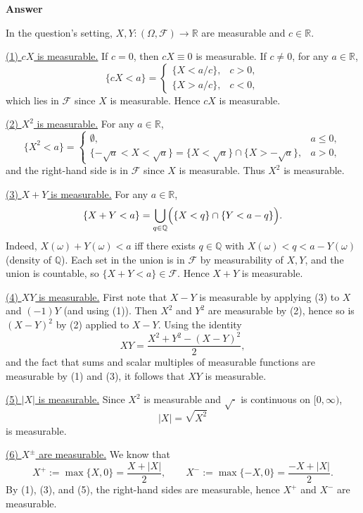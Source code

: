 \documentclass[letterpaper]{article}
\begin{document}
		\textbf{Answer}
		
			In the question's setting, $X,Y:(\Omega,\mathcal{F})\to\mathbb{R}$ are measurable and $c\in\mathbb{R}$.
			
			\medskip
			\noindent\underline{(1) $cX$ is measurable.}
			If $c=0$, then $cX\equiv 0$ is measurable. If $c\neq 0$, for any $a\in\mathbb{R}$,
			\[
			\{cX<a\}=
			\begin{cases}
				\{X<a/c\}, & c>0,\\
				\{X>a/c\}, & c<0,
			\end{cases}
			\]
			which lies in $\mathcal{F}$ since $X$ is measurable. Hence $cX$ is measurable.
			
			\medskip
			\noindent\underline{(2) $X^2$ is measurable.}
			For any $a\in\mathbb{R}$,
			\[
			\{X^2<a\}=
			\begin{cases}
				\emptyset, & a\le 0,\\
				\{-\sqrt{a}<X<\sqrt{a}\}
				=\{X<\sqrt{a}\}\cap\{X>-\sqrt{a}\}, & a>0,
			\end{cases}
			\]
			and the right-hand side is in $\mathcal{F}$ since $X$ is measurable. Thus $X^2$ is measurable.
			
			\medskip
			\noindent\underline{(3) $X+Y$ is measurable.}
			For any $a\in\mathbb{R}$,
			\[
			\{X+Y<a\}=\bigcup_{q\in\mathbb{Q}}\Bigl(\{X<q\}\cap\{Y<a-q\}\Bigr).
			\]
			Indeed, $X(\omega)+Y(\omega)<a$ iff there exists $q\in\mathbb{Q}$ with
			$X(\omega)<q<a-Y(\omega)$ (density of $\mathbb{Q}$).
			Each set in the union is in $\mathcal{F}$ by measurability of $X,Y$, and the union is countable,
			so $\{X+Y<a\}\in\mathcal{F}$. Hence $X+Y$ is measurable.
			
			\medskip
			\noindent\underline{(4) $XY$ is measurable.}
			First note that $X-Y$ is measurable by applying (3) to $X$ and $(-1)Y$ (and using (1)).
			Then $X^2$ and $Y^2$ are measurable by (2), hence so is $(X-Y)^2$ by (2) applied to $X-Y$.
			Using the identity
			\[
			XY=\frac{X^2+Y^2-(X-Y)^2}{2},
			\]
			and the fact that sums and scalar multiples of measurable functions are measurable by (1) and (3),
			it follows that $XY$ is measurable.
			
			\medskip
			\noindent\underline{(5) $|X|$ is measurable.}
			Since $X^2$ is measurable and $\sqrt{\cdot}$ is continuous on $[0,\infty)$,
			\[
			|X|=\sqrt{X^2}
			\]
			is measurable.
			
			\medskip
			\noindent\underline{(6) $X^{\pm}$ are measurable.}
			We know that
			\[
			X^+:=\max\{X,0\}=\frac{X+|X|}{2},
			\qquad
			X^-:=\max\{-X,0\}=\frac{-X+|X|}{2}.
			\]
			By (1), (3), and (5), the right-hand sides are measurable, hence $X^+$ and $X^-$ are measurable.
		
\end{document}
